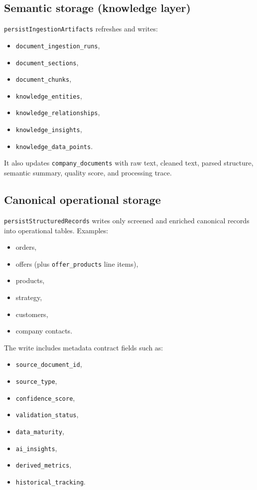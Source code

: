 \documentclass[11pt,a4paper]{article}
\begin{document}
\subsection{Semantic storage (knowledge layer)}
\texttt{persistIngestionArtifacts} refreshes and writes:
\begin{itemize}[leftmargin=*]
  \item \texttt{document\_ingestion\_runs},
  \item \texttt{document\_sections},
  \item \texttt{document\_chunks},
  \item \texttt{knowledge\_entities},
  \item \texttt{knowledge\_relationships},
  \item \texttt{knowledge\_insights},
  \item \texttt{knowledge\_data\_points}.
\end{itemize}

It also updates \texttt{company\_documents} with raw text, cleaned text, parsed structure, semantic summary, quality score, and processing trace.

\subsection{Canonical operational storage}
\texttt{persistStructuredRecords} writes only screened and enriched canonical records into operational tables. Examples:
\begin{itemize}[leftmargin=*]
  \item orders,
  \item offers (plus \texttt{offer\_products} line items),
  \item products,
  \item strategy,
  \item customers,
  \item company contacts.
\end{itemize}

The write includes metadata contract fields such as:
\begin{itemize}[leftmargin=*]
  \item \texttt{source\_document\_id},
  \item \texttt{source\_type},
  \item \texttt{confidence\_score},
  \item \texttt{validation\_status},
  \item \texttt{data\_maturity},
  \item \texttt{ai\_insights},
  \item \texttt{derived\_metrics},
  \item \texttt{historical\_tracking}.
\end{itemize}
\end{document}
